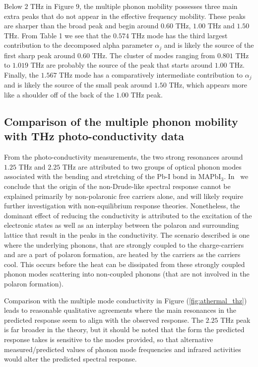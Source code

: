 Below $2$ THz in Figure $9$, the multiple phonon mobility possesses three main extra peaks that do not appear in the effective frequency mobility. These peaks are sharper than the broad peak and begin around $0.60$ THz, $1.00$ THz and $1.50$ THz. From Table 1 we see that the $0.574$ THz mode has the third largest contribution to the decomposed alpha parameter $\alpha_j$ and is likely the source of the first sharp peak around $0.60$ THz. The cluster of modes ranging from $0.801$ THz to $1.019$ THz are probably the source of the peak that starts around $1.00$ THz. Finally, the $1.567$ THz mode has a comparatively intermediate contribution to $\alpha_j$ and is likely the source of the small peak around $1.50$ THz, which appears more like a shoulder off of the back of the $1.00$ THz peak.

\subsection{Comparison of the multiple phonon mobility with THz photo-conductivity data}

From the photo-conductivity measurements, the two strong resonances around $1.25$ THz and $2.25$ THz are attributed to two groups of optical phonon modes associated with the bending and stretching of the Pb-I bond in MAPbI$_3$. In~\cite{zheng_multipulse_2021} we conclude that the origin of the non-Drude-like spectral response cannot be explained primarily by non-polaronic free carriers alone, and will likely require further investigation with non-equilibrium response theories. Nonetheless, the dominant effect of reducing the conductivity is attributed to the excitation of the electronic states as well as an interplay between the polaron and surrounding lattice that result in the peaks in the conductivity. The scenario described is one where the underlying phonons, that are strongly coupled to the charge-carriers and are a part of polaron formation, are heated by the carriers as the carriers cool. This occurs before the heat can be dissipated from these strongly coupled phonon modes scattering into non-coupled phonons (that are not involved in the polaron formation). 

Comparison with the multiple mode conductivity in Figure (\ref{fig:athermal_thz}) leads to reasonable qualitative agreements where the main resonances in the predicted response seem to align with the observed response. The $2.25$ THz peak is far broader in the theory, but it should be noted that the form the predicted response takes is sensitive to the modes provided, so that alternative measured/predicted values of phonon mode frequencies and infrared activities would alter the predicted spectral response. 

